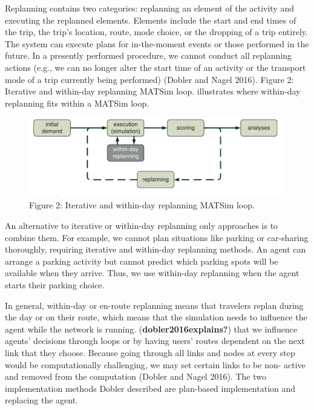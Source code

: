 \documentclass[
  letterpaper,
  DIV=11,
  numbers=noendperiod]{scrreprt}
\begin{document}
Replanning contains two categories: replanning an element of the
activity and executing the replanned elements. Elements include the
start and end times of the trip, the trip's location, route, mode
choice, or the dropping of a trip entirely. The system can execute plans
for in-the-moment events or those performed in the future. In a
presently performed procedure, we cannot conduct all replanning actions
(e.g., we can no longer alter the start time of an activity or the
transport mode of a trip currently being performed) (Dobler and Nagel
2016). Figure 2: Iterative and within-day replanning MATSim loop.
illustrates where within-day replanning fits within a MATSim loop.

\begin{figure}

{\centering \includegraphics{figures/fig2.png}

}

\caption{Figure 2: Iterative and within-day replanning MATSim loop.}

\end{figure}

An alternative to iterative or within-day replanning only approaches is
to combine them. For example, we cannot plan situations like parking or
car-sharing thoroughly, requiring iterative and within-day replanning
methods. An agent can arrange a parking activity but cannot predict
which parking spots will be available when they arrive. Thus, we use
within-day replanning when the agent starts their parking choice.

In general, within-day or en-route replanning means that travelers
replan during the day or on their route, which means that the simulation
needs to influence the agent while the network is running.
(\textbf{dobler2016explains?}) that we influence agents' decisions
through loops or by having users' routes dependent on the next link that
they choose. Because going through all links and nodes at every step
would be computationally challenging, we may set certain links to be
non- active and removed from the computation (Dobler and Nagel 2016).
The two implementation methods Dobler described are plan-based
implementation and replacing the agent.
\end{document}
